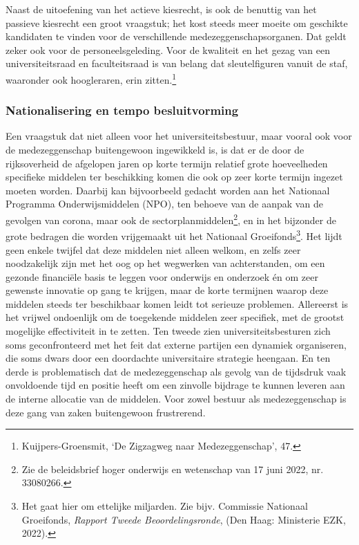 \documentclass[smallauthor, chapterhaspagenum, nochapterinheader, pagenuminheader,  bigchapnum,medium2, tocpages,  garamond, titleinheader]{jote-book}
\begin{document}
	Naast de uitoefening van het actieve kiesrecht, is ook de benuttig van het passieve kiesrecht een groot vraagstuk; het kost steeds meer moeite om geschikte kandidaten te vinden voor de verschillende medezeggenschapsorganen. Dat geldt zeker ook voor de personeelsgeleding. Voor de kwaliteit en het gezag van een universiteitsraad en faculteitsraad is van belang dat sleutelfiguren vanuit de staf, waaronder ook hoogleraren, erin zitten.\footnote{Kuijpers-Groensmit, ‘De Zigzagweg naar Medezeggenschap', 47.}



	\subsubsection{Nationalisering en tempo besluitvorming}



	Een vraagstuk dat niet alleen voor het universiteitsbestuur, maar vooral ook voor de medezeggenschap buitengewoon ingewikkeld is, is dat er de door de rijksoverheid de afgelopen jaren op korte termijn relatief grote hoeveelheden specifieke middelen ter beschikking komen die ook op zeer korte termijn ingezet moeten worden. Daarbij kan bijvoorbeeld gedacht worden aan het Nationaal Programma Onderwijsmiddelen (NPO), ten behoeve van de aanpak van de gevolgen van corona, maar ook de sectorplanmiddelen\footnote{Zie de beleidsbrief hoger onderwijs en wetenschap van 17 juni 2022, nr. 33080266.}, en in het bijzonder de grote bedragen die worden vrijgemaakt uit het Nationaal Groeifonds\footnote{Het gaat hier om ettelijke miljarden. Zie bijv. Commissie Nationaal Groeifonds, \emph{Rapport Tweede Beoordelingsronde}, (Den Haag: Ministerie EZK, 2022).}. Het lijdt geen enkele twijfel dat deze middelen niet alleen welkom, en zelfs zeer noodzakelijk zijn met het oog op het wegwerken van achterstanden, om een gezonde financiële basis te leggen voor onderwijs en onderzoek én om zeer gewenste innovatie op gang te krijgen, maar de korte termijnen waarop deze middelen steeds ter beschikbaar komen leidt tot serieuze problemen. Allereerst is het vrijwel ondoenlijk om de toegekende middelen zeer specifiek, met de grootst mogelijke effectiviteit in te zetten. Ten tweede zien universiteitsbesturen zich soms geconfronteerd met het feit dat externe partijen een dynamiek organiseren, die soms dwars door een doordachte universitaire strategie heengaan. En ten derde is problematisch dat de medezeggenschap als gevolg van de tijdsdruk vaak onvoldoende tijd en positie heeft om een zinvolle bijdrage te kunnen leveren aan de interne allocatie van de middelen. Voor zowel bestuur als medezeggenschap is deze gang van zaken buitengewoon frustrerend.
\end{document}
